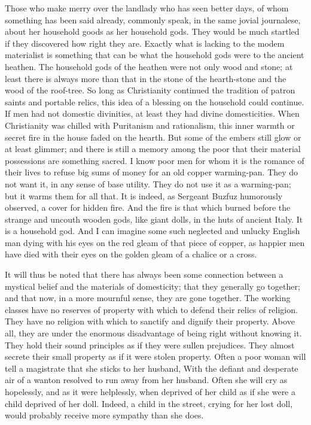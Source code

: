 \documentclass{book}
\begin{document}
Those who make merry over the landlady who has seen better days, of whom something has been said already, commonly speak, in the same jovial journalese, about her household goods as her household gods. They would be much startled if they discovered how right they are. Exactly what is lacking to the modem materialist is something that can be what the household gods were to the ancient heathen. The household gods of the heathen were not only wood and stone; at least there is always more than that in the stone of the hearth-stone and the wood of the roof-tree. So long as Christianity continued the tradition of patron saints and portable relics, this idea of a blessing on the household could continue. If men had not domestic divinities, at least they had divine domesticities. When Christianity was chilled with Puritanism and rationalism, this inner warmth or secret fire in the house faded on the hearth. But some of the embers still glow or at least glimmer; and there is still a memory among the poor that their material possessions are something sacred. I know poor men for whom it is the romance of their lives to refuse big sums of money for an old copper warming-pan. They do not want it, in any sense of base utility. They do not use it as a warming-pan; but it warms them for all that. It is indeed, as Sergeant Buzfuz humorously observed, a cover for hidden fire. And the fire is that which burned before the strange and uncouth wooden gods, like giant dolls, in the huts of ancient Italy. It is a household god. And I can imagine some such neglected and unlucky English man dying with his eyes on the red gleam of that piece of copper, as happier men have died with their eyes on the golden gleam of a chalice or a cross.

It will thus be noted that there has always been some connection between a mystical belief and the materials of domesticity; that they generally go together; and that now, in a more mournful sense, they are gone together. The working classes have no reserves of property with which to defend their relics of religion. They have no religion with which to sanctify and dignify their property. Above all, they are under the enormous disadvantage of being right without knowing it. They hold their sound principles as if they were sullen prejudices. They almost secrete their small property as if it were stolen property. Often a poor woman will tell a magistrate that she sticks to her husband, With the defiant and desperate air of a wanton resolved to run away from her husband. Often she will cry as hopelessly, and as it were helplessly, when deprived of her child as if she were a child deprived of her doll. Indeed, a child in the street, crying for her lost doll, would probably receive more sympathy than she does.
\end{document}
